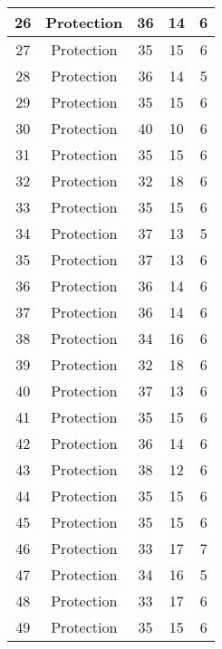 \documentclass[results.tex]{subfiles}
\begin{document}
\begin{center}
\begin{tabular}{| c || c | c | c | c |}
    \hline
    26 & Protection & 36 & 14 & 6 \\ 
    \hline
    27 & Protection & 35 & 15 & 6 \\ 
    \hline
    28 & Protection & 36 & 14 & 5 \\ 
    \hline
    29 & Protection & 35 & 15 & 6 \\ 
    \hline
    30 & Protection & 40 & 10 & 6 \\ 
    \hline
    31 & Protection & 35 & 15 & 6 \\ 
    \hline
    32 & Protection & 32 & 18 & 6 \\ 
    \hline
    33 & Protection & 35 & 15 & 6 \\ 
    \hline
    34 & Protection & 37 & 13 & 5 \\ 
    \hline
    35 & Protection & 37 & 13 & 6 \\ 
    \hline
    36 & Protection & 36 & 14 & 6 \\ 
    \hline
    37 & Protection & 36 & 14 & 6 \\ 
    \hline
    38 & Protection & 34 & 16 & 6 \\ 
    \hline
    39 & Protection & 32 & 18 & 6 \\ 
    \hline
    40 & Protection & 37 & 13 & 6 \\ 
    \hline
    41 & Protection & 35 & 15 & 6 \\ 
    \hline
    42 & Protection & 36 & 14 & 6 \\ 
    \hline
    43 & Protection & 38 & 12 & 6 \\ 
    \hline
    44 & Protection & 35 & 15 & 6 \\ 
    \hline
    45 & Protection & 35 & 15 & 6 \\ 
    \hline
    46 & Protection & 33 & 17 & 7 \\ 
    \hline
    47 & Protection & 34 & 16 & 5 \\ 
    \hline
    48 & Protection & 33 & 17 & 6 \\ 
    \hline
    49 & Protection & 35 & 15 & 6 \\ 
    \hline   \end{tabular}
\end{center}
\end{document}
